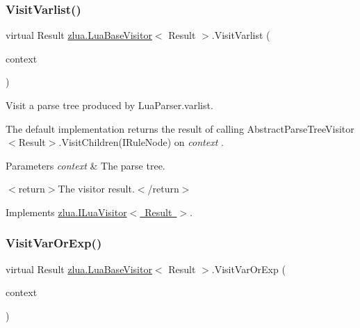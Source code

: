 \mbox{\label{classzlua_1_1_lua_base_visitor_a0afd36a66f579f1e86113881d8e8c78e}} 
\subsubsection{\texorpdfstring{Visit\+Varlist()}{VisitVarlist()}}
{\footnotesize\ttfamily virtual Result \mbox{\hyperlink{classzlua_1_1_lua_base_visitor}{zlua.\+Lua\+Base\+Visitor}}$<$ Result $>$.Visit\+Varlist (\begin{DoxyParamCaption}\item[{\mbox{[}\+Not\+Null\mbox{]} \mbox{\hyperlink{classzlua_1_1_lua_parser_1_1_varlist_context}{Lua\+Parser.\+Varlist\+Context}}}]{context }\end{DoxyParamCaption})\hspace{0.3cm}{\ttfamily [virtual]}}



Visit a parse tree produced by Lua\+Parser.\+varlist. 

The default implementation returns the result of calling Abstract\+Parse\+Tree\+Visitor$<$\+Result$>$.\+Visit\+Children(\+I\+Rule\+Node) on {\itshape context} . 


\begin{DoxyParams}{Parameters}
{\em context} & The parse tree.\\
\hline
\end{DoxyParams}
$<$return$>$The visitor result.$<$/return$>$ 

Implements \mbox{\hyperlink{interfacezlua_1_1_i_lua_visitor_aadf416d9a85416107f278f794421819e}{zlua.\+I\+Lua\+Visitor$<$ Result $>$}}.

\mbox{\label{classzlua_1_1_lua_base_visitor_af08ef8c1371425dfa9b10a7df2e8e011}} 
\subsubsection{\texorpdfstring{Visit\+Var\+Or\+Exp()}{VisitVarOrExp()}}
{\footnotesize\ttfamily virtual Result \mbox{\hyperlink{classzlua_1_1_lua_base_visitor}{zlua.\+Lua\+Base\+Visitor}}$<$ Result $>$.Visit\+Var\+Or\+Exp (\begin{DoxyParamCaption}\item[{\mbox{[}\+Not\+Null\mbox{]} \mbox{\hyperlink{classzlua_1_1_lua_parser_1_1_var_or_exp_context}{Lua\+Parser.\+Var\+Or\+Exp\+Context}}}]{context }\end{DoxyParamCaption})\hspace{0.3cm}{\ttfamily [virtual]}}



